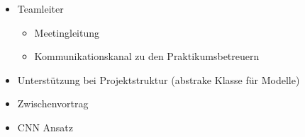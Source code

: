 \begin{itemize}
    \item Teamleiter
    \begin{itemize}
        \item Meetingleitung

        \item Kommunikationskanal zu den Praktikumsbetreuern
    \end{itemize}

    \item Unterstützung bei Projektstruktur (abstrake Klasse für Modelle)

    \item Zwischenvortrag

    \item CNN Ansatz
\end{itemize}